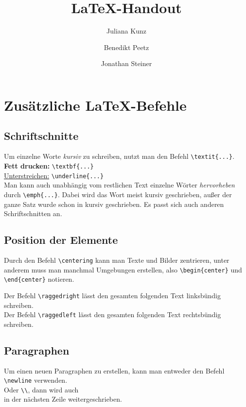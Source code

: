 \documentclass[ngerman]{scrreport}
\title{\LaTeX{}-Handout}
\author{Juliana Kunz \and Benedikt Peetz \and Jonathan Steiner}
\date{}
\begin{document}
\maketitle

\chapter*{\centering Zusätzliche \LaTeX{}-Befehle}

\section*{Schriftschnitte}
Um einzelne Worte \textit{kursiv} zu schreiben, nutzt man den Befehl {\color{blue}\verb|\textit{...}|}.\\
\textbf{Fett drucken:} {\color{blue}\verb|\textbf{...}|}\\
\underline{Unterstreichen:} {\color{blue}\verb|\underline{...}|}\\
Man kann auch unabhängig vom restlichen Text einzelne Wörter \emph{hervorheben} durch {\color{blue}\verb|\emph{...}|}. Dabei wird das Wort meist kursiv geschrieben, außer der ganze Satz wurde schon in kursiv geschrieben. Es passt sich auch anderen Schriftschnitten an.


\section*{Position der Elemente}
Durch den Befehl {\color{blue}\verb|\centering|} kann man Texte und Bilder zentrieren, unter anderem muss man manchmal Umgebungen erstellen, also {\color{blue}\verb|\begin{center}|} und {\color{blue}\verb|\end{center}|} notieren.\\
\raggedright Der Befehl {\color{blue}\verb|\raggedright|} lässt den gesamten folgenden Text linksbündig schreiben.\\
\raggedleft Der Befehl {\color{blue}\verb|\raggedleft|} lässt den gesamten folgenden Text rechtsbündig schreiben.
\raggedright

\section*{Paragraphen}
Um einen neuen Paragraphen zu erstellen, kann man entweder den Befehl {\color{blue}\verb|\newline|} \newline verwenden.\\ Oder {\color{blue}\verb|\\|}, dann wird auch \\ in der nächsten Zeile weitergeschrieben.
\end{document}
